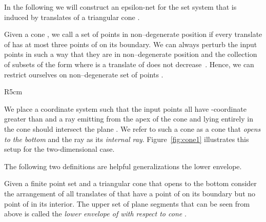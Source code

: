 \documentclass{stacs_proc}
\begin{document}
In the following we will construct an epsilon-net for the set system
 that is induced by translates of a 
triangular cone . 

Given a cone , we call a set of points  in non--degenerate
position if every translate of  has at most three points of  on
its boundary. We can always perturb the input points  in such a way
that they are in non--degenerate position and the collection of
subsets of the form  where  is a translate of  does
not decrease~\cite{EW85}. Hence, we can restrict ourselves on
non--degenerate set of points .  

\begin{wrapfigure}[11]{R}{5cm}
  \begin{center}
    \caption{The cone  and its internal ray .}
    \label{fig:cone1}
  \end{center}
\end{wrapfigure}
We place a
coordinate system  such that the input points all have -coordinate
greater than  and a ray  emitting from the apex of the cone  and
lying entirely in the cone should intersect the plane . We refer
to such a cone as a cone that \emph{opens to the bottom} and the ray  as
its \emph{internal ray}.
Figure~\ref{fig:cone1} illustrates this setup for the two-dimensional
case.


The following two definitions are helpful generalizations the lower
envelope. 



\begin{defi}
  Given a finite point set  and a triangular cone  that opens to
  the bottom consider the arrangement 
  of all translates of  that have a point of  on its boundary
  but no point of  in its interior. The upper set of plane segments
  that can be seen from above is called the \emph{lower envelope of
     with respect to cone }.
\end{defi}
\end{document}

